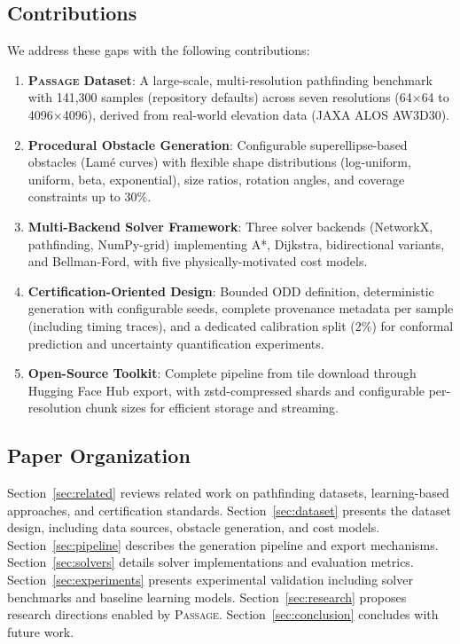 \documentclass{article}
\newcommand{\dataset}{\textsc{Passage}}
\begin{document}
\subsection{Contributions}

We address these gaps with the following contributions:

\begin{enumerate}[noitemsep]
    \item \textbf{\dataset{} Dataset}: A large-scale, multi-resolution pathfinding benchmark with 141{,}300 samples (repository defaults) across seven resolutions (64$\times$64 to 4096$\times$4096), derived from real-world elevation data (JAXA ALOS AW3D30).

    \item \textbf{Procedural Obstacle Generation}: Configurable superellipse-based obstacles (Lamé curves) with flexible shape distributions (log-uniform, uniform, beta, exponential), size ratios, rotation angles, and coverage constraints up to 30\%.

    \item \textbf{Multi-Backend Solver Framework}: Three solver backends (NetworkX, pathfinding, NumPy-grid) implementing A*, Dijkstra, bidirectional variants, and Bellman-Ford, with five physically-motivated cost models.

    \item \textbf{Certification-Oriented Design}: Bounded ODD definition, deterministic generation with configurable seeds, complete provenance metadata per sample (including timing traces), and a dedicated calibration split (2\%) for conformal prediction and uncertainty quantification experiments.

    \item \textbf{Open-Source Toolkit}: Complete pipeline from tile download through Hugging Face Hub export, with zstd-compressed shards and configurable per-resolution chunk sizes for efficient storage and streaming.
\end{enumerate}

\subsection{Paper Organization}

Section~\ref{sec:related} reviews related work on pathfinding datasets, learning-based approaches, and certification standards. Section~\ref{sec:dataset} presents the dataset design, including data sources, obstacle generation, and cost models. Section~\ref{sec:pipeline} describes the generation pipeline and export mechanisms. Section~\ref{sec:solvers} details solver implementations and evaluation metrics. Section~\ref{sec:experiments} presents experimental validation including solver benchmarks and baseline learning models. Section~\ref{sec:research} proposes research directions enabled by \dataset{}. Section~\ref{sec:conclusion} concludes with future work.
\end{document}
